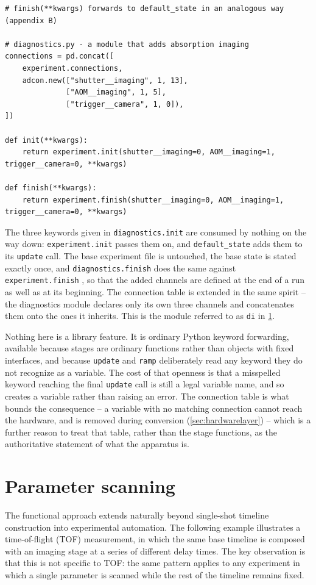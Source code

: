 \documentclass{SciPost}
\newcommand{\python}[1]{%
  \texttt{#1}%
}
\begin{document}
\begin{appendix}
\begin{verbatim}
# finish(**kwargs) forwards to default_state in an analogous way (appendix B)

# diagnostics.py - a module that adds absorption imaging
connections = pd.concat([
    experiment.connections,
    adcon.new(["shutter__imaging", 1, 13],
              ["AOM__imaging", 1, 5],
              ["trigger__camera", 1, 0]),
])

def init(**kwargs):
    return experiment.init(shutter__imaging=0, AOM__imaging=1, trigger__camera=0, **kwargs)

def finish(**kwargs):
    return experiment.finish(shutter__imaging=0, AOM__imaging=1, trigger__camera=0, **kwargs)
\end{verbatim}

The three keywords given in \python{diagnostics.init} are consumed by nothing on the way down: \python{experiment.init} passes them on, and \python{default_state} adds them to its \python{update} call. The base experiment file is untouched, the base state is stated exactly once, and \python{diagnostics.finish} does the same against \python{experiment.finish}, so that the added channels are defined at the end of a run as well as at its beginning. The connection table is extended in the same spirit – the diagnostics module declares only its own three channels and concatenates them onto the ones it inherits. This is the module referred to as \python{di} in \cref{sec:parameter_scan}.

Nothing here is a library feature. It is ordinary Python keyword forwarding, available because stages are ordinary functions rather than objects with fixed interfaces, and because \python{update} and \python{ramp} deliberately read any keyword they do not recognize as a variable. The cost of that openness is that a misspelled keyword reaching the final \python{update} call is still a legal variable name, and so creates a variable rather than raising an error. The connection table is what bounds the consequence – a variable with no matching connection cannot reach the hardware, and is removed during conversion (\cref{sec:hardwarelayer}) – which is a further reason to treat that table, rather than the stage functions, as the authoritative statement of what the apparatus is.

\section{Parameter scanning}
\label{sec:parameter_scan}
The functional approach extends naturally beyond single-shot timeline construction into experimental automation. The following example illustrates a time-of-flight (TOF) measurement, in which the same base timeline is composed with an imaging stage at a series of different delay times. The key observation is that this is not specific to TOF: the same pattern applies to any experiment in which a single parameter is scanned while the rest of the timeline remains fixed.
 

\end{appendix}
\end{document}

